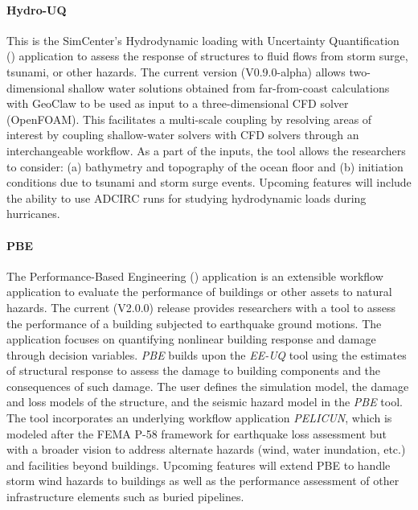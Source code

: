 \paragraph{Hydro-UQ} This is the SimCenter's Hydrodynamic loading with Uncertainty Quantification () application to assess the response of structures to fluid flows from storm surge, tsunami, or other hazards. The current version (V0.9.0-alpha) allows two-dimensional shallow water solutions obtained from far-from-coast calculations with GeoClaw  to be used as input to a three-dimensional CFD solver (OpenFOAM). This facilitates a multi-scale coupling by resolving areas of interest by coupling shallow-water solvers with CFD solvers through an interchangeable workflow. As a part of the inputs, the tool allows the researchers to consider: (a) bathymetry and topography of the ocean floor and (b) initiation conditions due to tsunami and storm surge events. Upcoming features will include the ability to use ADCIRC runs for studying hydrodynamic loads during hurricanes.

\paragraph{PBE} The Performance-Based Engineering () application is an extensible workflow application to evaluate the performance of buildings or other assets to natural hazards. The current (V2.0.0) release provides researchers with a tool to assess the performance of a building subjected to earthquake ground motions. The application focuses on quantifying nonlinear building response and damage through decision variables. \emph{PBE} builds upon the \emph{EE-UQ} tool using the estimates of structural response to assess the damage to building components and the consequences of such damage. The user defines the simulation model, the damage and loss models of the structure, and the seismic hazard model in the \emph{PBE} tool. The tool incorporates an underlying workflow application \emph{PELICUN}, which is modeled after the FEMA P-58 framework for earthquake loss assessment but with a broader vision to address alternate hazards (wind, water inundation, etc.) and facilities beyond buildings. Upcoming features will extend PBE to handle storm wind hazards to buildings as well as the performance assessment of other infrastructure elements such as buried pipelines.

